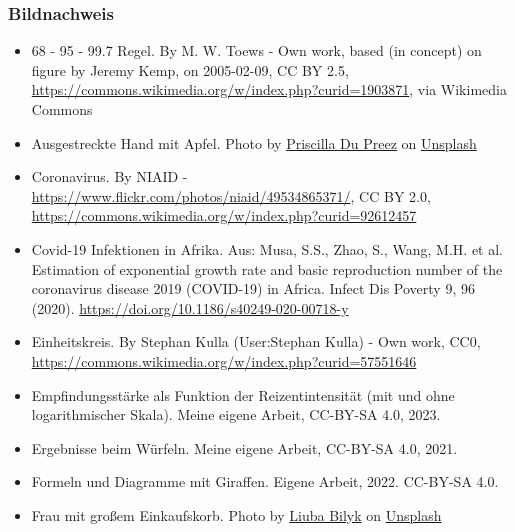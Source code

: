 \documentclass{beamer}
\begin{document}
\begin{frame}
\frametitle{Bildnachweis}


\begin{tiny}
 
\begin{itemize}


\item
 68 - 95 - 99.7 Regel. By M. W. Toews - Own work, based (in concept) on figure by Jeremy Kemp, on 2005-02-09, CC BY 2.5, \url{https://commons.wikimedia.org/w/index.php?curid=1903871}, via Wikimedia Commons

\item
Ausgestreckte Hand mit Apfel. Photo by \href{https://unsplash.com/@priscilladupreez?utm_source=unsplash&utm_medium=referral&utm_content=creditCopyText}{Priscilla Du Preez} on \href{https://unsplash.com/s/photos/apple?utm_source=unsplash&utm_medium=referral&utm_content=creditCopyText}{Unsplash}


\item
Coronavirus. By NIAID - \url{https://www.flickr.com/photos/niaid/49534865371/}, CC BY 2.0, \url{https://commons.wikimedia.org/w/index.php?curid=92612457}

\item
Covid-19 Infektionen in Afrika. Aus: Musa, S.S., Zhao, S., Wang, M.H. et al. Estimation of exponential growth rate and basic reproduction number of the coronavirus disease 2019 (COVID-19) in Africa. Infect Dis Poverty 9, 96 (2020). \url{https://doi.org/10.1186/s40249-020-00718-y}

\item
Einheitskreis. By Stephan Kulla (User:Stephan Kulla) - Own work, CC0, \url{https://commons.wikimedia.org/w/index.php?curid=57551646}

\item
Empfindungsstärke als Funktion der Reizentintensität (mit und ohne logarithmischer Skala). Meine eigene Arbeit, CC-BY-SA 4.0, 2023.


\item
Ergebnisse beim Würfeln. Meine eigene Arbeit, CC-BY-SA 4.0, 2021.

\item
Formeln und Diagramme mit Giraffen. Eigene Arbeit, 2022. CC-BY-SA 4.0.

\item 
Frau mit großem Einkaufskorb. Photo by \href{https://unsplash.com/@ibilyk?utm_source=unsplash&utm_medium=referral&utm_content=creditCopyText}{Liuba Bilyk} on \href{https://unsplash.com/s/photos/carrying-groceries?utm_source=unsplash&utm_medium=referral&utm_content=creditCopyText}{Unsplash}



\end{itemize}
\end{tiny}
\end{frame}
\end{document}
